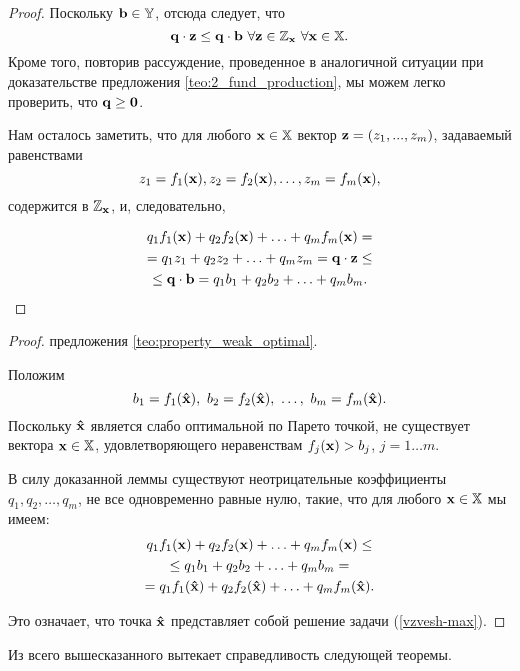 \begin{proof}
    Поскольку $\mathbf{b}\in\mathbb{Y}$, отсюда следует, что
\[
    \mathbf{q} \cdot \mathbf{z} \leq \mathbf{q} \cdot \mathbf{b} \
    \forall\mathbf{z}\in\mathbb{Z_{\mathbf{x}}} \ \forall\mathbf{x}\in\mathbb{X}.
\]
    Кроме того, повторив рассуждение, проведенное в аналогичной ситуации при
    доказательстве предложения \ref{teo:2_fund_production}, мы можем
    легко проверить, что $\mathbf{q}\geq\mathbf{0}$.

    Нам осталось заметить, что для любого $\mathbf{x}\in\mathbb{X}$ вектор
    $\mathbf{z}=(z_{1},...,z_{m})$, задаваемый равенствами
\[
    z_1=f_1(\mathbf{x}), z_2=f_2(\mathbf{x}), \ldots, z_m=f_m(\mathbf{x}),
\]
    содержится в $\mathbb{Z_{\mathbf{x}}}$, и, следовательно,


\begin{multline*}
    q_1 f_1(\mathbf{x}) + q_2 f_2(\mathbf{x}) + \ldots + q_m f_m(\mathbf{x})=\\
    =q_1 z_1 + q_2 z_2 + \ldots + q_m z_m=\mathbf{q}\cdot\mathbf{z} \leq\\
       \leq\mathbf{q}\cdot\mathbf{b}=q_1 b_1 + q_2 b_2 + \ldots + q_m b_m.
\end{multline*}

\end{proof}



\begin{proof} предложения \ref{teo:property_weak_optimal}.

Положим
\[
 b_1 =f_1(\mathbf{\hat x}), \ b_2 =f_2(\mathbf{\hat x}), \ \ldots, \ b_m =f_m(\mathbf{\hat x}).
\]
Поскольку $\mathbf{\hat x}$ является слабо оптимальной по Парето точкой, не существует вектора
$\mathbf{x} \in \mathbb{X}$, удовлетворяющего неравенствам $f_j(\mathbf{x})> b_{j}$, $j=1 \ldots m$.


В силу доказанной леммы существуют неотрицательные коэффициенты $q_1, q_2, \ldots, q_m$, не
все одновременно равные нулю, такие, что для любого $\mathbf{x} \in \mathbb{X}$ мы имеем:
\begin{multline*}
    q_1 f_1(\mathbf{x}) + q_2 f_2(\mathbf{x}) + \ldots + q_m f_m(\mathbf{x})\leq  \\
    \leq q_1 b_1 + q_2 b_2 + \ldots + q_m b_m =
    \\ = q_1 f_1(\mathbf{\hat x}) + q_2 f_2(\mathbf{\hat x}) + \ldots + q_m f_m(\mathbf{\hat x}).
\end{multline*}

Это означает, что точка $\mathbf{\hat x}$ представляет собой решение
задачи (\ref{vzvesh-max}).

\end{proof}

Из всего вышесказанного вытекает справедливость следующей теоремы.


